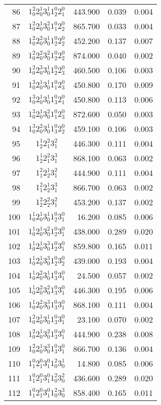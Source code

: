 \documentclass[12pt]{article}
\begin{document}
\begin{table}
\begin{tabular}{rcrrr}
86&$1_0^2 2_0^1 3_0^1 1_2^0 2_1^0$& 443.900& 0.039& 0.004\\
87&$1_0^2 2_0^1 3_0^2 1_1^0 2_2^0$& 865.700& 0.033& 0.004\\
88&$1_0^2 2_0^2 3_0^1 1_2^0 2_2^0$& 452.200& 0.137& 0.007\\
89&$1_0^2 2_0^2 3_0^2 1_2^0 2_2^0$& 874.000& 0.040& 0.002\\
90&$1_0^2 2_0^3 3_0^1 1_2^0 2_3^0$& 460.500& 0.106& 0.003\\
91&$1_0^3 2_0^1 3_0^1 1_1^0 2_3^0$& 450.800& 0.170& 0.009\\
92&$1_0^3 2_0^1 3_0^1 1_3^0 2_1^0$& 450.800& 0.113& 0.006\\
93&$1_0^3 2_0^1 3_0^2 1_1^0 2_3^0$& 872.600& 0.050& 0.003\\
94&$1_0^3 2_0^2 3_0^1 1_3^0 2_2^0$& 459.100& 0.106& 0.003\\
95&$1_2^1 2_1^2 3_1^2$&446.300 &0.111 &0.004\\
96&$1_2^1 2_1^2 3_1^3$&868.100 &0.063 &0.002\\
97&$1_1^2 2_2^1 3_1^2$&444.900 &0.111 &0.004\\
98&$1_1^2 2_2^1 3_1^3$&866.700 &0.063 &0.002\\
99&$1_2^2 2_2^2 3_1^2$&453.200 &0.137 &0.002\\
100&$1_0^1 2_0^1 3_0^1 1_2^0 3_1^0$& 16.200& 0.085& 0.006\\
101&$1_0^1 2_0^1 3_0^2 1_2^0 3_1^0$& 438.000& 0.289& 0.020\\
102&$1_0^1 2_0^1 3_0^3 1_2^0 3_1^0$& 859.800& 0.165& 0.011\\
103&$1_0^1 2_0^1 3_0^3 1_2^0 3_2^0$& 439.000& 0.193& 0.004\\
104&$1_0^1 2_0^2 3_0^1 1_3^0 3_1^0$& 24.500& 0.057& 0.002\\
105&$1_0^1 2_0^2 3_0^2 1_3^0 3_1^0$& 446.300& 0.195& 0.006\\
106&$1_0^1 2_0^2 3_0^3 1_3^0 3_1^0$& 868.100& 0.111& 0.004\\
107&$1_0^2 2_0^1 3_0^1 1_3^0 3_1^0$& 23.100& 0.070& 0.002\\
108&$1_0^2 2_0^1 3_0^2 1_3^0 3_1^0$& 444.900& 0.238& 0.008\\
109&$1_0^2 2_0^1 3_0^3 1_3^0 3_1^0$& 866.700& 0.136& 0.004\\
110&$1_1^0 2_1^0 3_1^0 1_0^2 3_0^1$& 14.800& 0.085& 0.006\\
111&$1_1^0 2_1^0 3_1^0 1_0^2 3_0^2$& 436.600& 0.289& 0.020\\
112&$1_1^0 2_1^0 3_1^0 1_0^2 3_0^3$& 858.400& 0.165& 0.011\\

\end{tabular}
\end{table}
\end{document}
